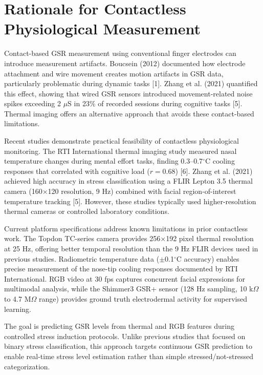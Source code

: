 \section{Rationale for Contactless Physiological Measurement}
Contact-based GSR measurement using conventional finger electrodes can introduce measurement artifacts. Boucsein (2012) documented how electrode attachment and wire movement creates motion artifacts in GSR data, particularly problematic during dynamic tasks [1]. Zhang et al. (2021) quantified this effect, showing that wired GSR sensors introduced movement-related noise spikes exceeding 2 $\mu$S in 23\% of recorded sessions during cognitive tasks [5]. Thermal imaging offers an alternative approach that avoids these contact-based limitations.

Recent studies demonstrate practical feasibility of contactless physiological monitoring. The RTI International thermal imaging study measured nasal temperature changes during mental effort tasks, finding 0.3--0.7$^\circ$C cooling responses that correlated with cognitive load ($r = 0.68$) [6]. Zhang et al. (2021) achieved high accuracy in stress classification using a FLIR Lepton 3.5 thermal camera (160$\times$120 resolution, 9 Hz) combined with facial region-of-interest temperature tracking [5]. However, these studies typically used higher-resolution thermal cameras or controlled laboratory conditions.

Current platform specifications address known limitations in prior contactless work. The Topdon TC-series camera provides 256$\times$192 pixel thermal resolution at 25 Hz, offering better temporal resolution than the 9 Hz FLIR devices used in previous studies. Radiometric temperature data ($\pm$0.1$^\circ$C accuracy) enables precise measurement of the nose-tip cooling responses documented by RTI International. RGB video at 30 fps captures concurrent facial expressions for multimodal analysis, while the Shimmer3 GSR+ sensor (128 Hz sampling, 10 k$\Omega$ to 4.7 M$\Omega$ range) provides ground truth electrodermal activity for supervised learning.

The goal is predicting GSR levels from thermal and RGB features during controlled stress induction protocols. Unlike previous studies that focused on binary stress classification, this approach targets continuous GSR prediction to enable real-time stress level estimation rather than simple stressed/not-stressed categorization.

